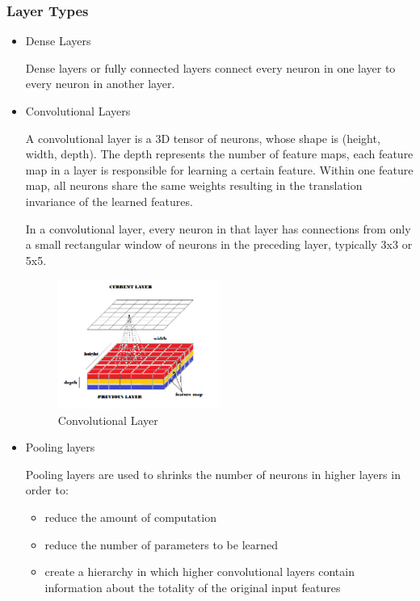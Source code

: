 \documentclass[a4paper,10pt]{article}
\begin{document}
 \subsubsection{Layer Types}
 	\begin{itemize}
 		\item Dense Layers
 		
 		\quad Dense layers or fully connected layers connect every neuron in one layer to every neuron in another layer.
 		\vspace{5mm} %
 		
 		\item Convolutional Layers
 		
 		\quad A convolutional layer is a 3D tensor of neurons, whose shape is (height, width, depth). The depth represents the number of feature maps, each feature map in a layer is responsible for learning a certain feature. Within one feature map, all neurons share the same weights resulting in the translation invariance of the learned features. 
 		
 		
 		\quad In a convolutional layer, every neuron in that layer has connections from only a small rectangular window of neurons in the preceding layer, typically  3x3 or 5x5.
 		
 		 \begin{figure}[!htbp]
 		 	\centering
 		 	\includegraphics[width=0.5\textwidth]{convnet.png}
 		 	\caption{Convolutional Layer}
 		 \end{figure}
 		
 		\vspace{5mm} %
 		\item Pooling layers
 		
 		\quad Pooling layers are used to shrinks the number of neurons in higher layers in order to:
 		\begin{itemize}
 			\item reduce the amount of computation
 			\item reduce the number of parameters to be learned
 			\item create a hierarchy in which higher convolutional layers contain information about the totality of the
 			original input features
 		\end{itemize}
 	

\end{itemize}
\end{document}
